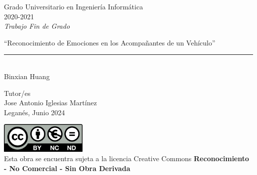 \documentclass[12pt]{report} %
\begin{document}
	
\begin{titlepage}
	\begin{sffamily}
	\color{azulUC3M}
	\begin{center}
		\begin{figure}[H] %
		\end{figure}
		\vspace{2.5cm}
		\begin{Large}
			Grado Universitario en Ingeniería Informática\\			
			 2020-2021\\ %
			\vspace{2cm}		
			\textsl{Trabajo Fin de Grado}
			\bigskip
			
		\end{Large}
		 	{\Huge ``Reconocimiento de Emociones en los Acompañantes de un Vehículo''}\\
		 	\vspace*{0.5cm}
	 		\rule{10.5cm}{0.1mm}\\
			\vspace*{0.9cm}
			{\LARGE Binxian Huang}\\ 
			\vspace*{1cm}
		\begin{Large}
			Tutor/es\\
			Jose Antonio Iglesias Martínez\\
			Leganés, Junio 2024\\
		\end{Large}
	\end{center}
	\vfill
	\color{black}
	\includegraphics[width=4.2cm]{creativecommons.png}\\ %
	Esta obra se encuentra sujeta a la licencia Creative Commons \textbf{Reconocimiento - No Comercial - Sin Obra Derivada}
	\end{sffamily}
\end{titlepage}
\end{document}
